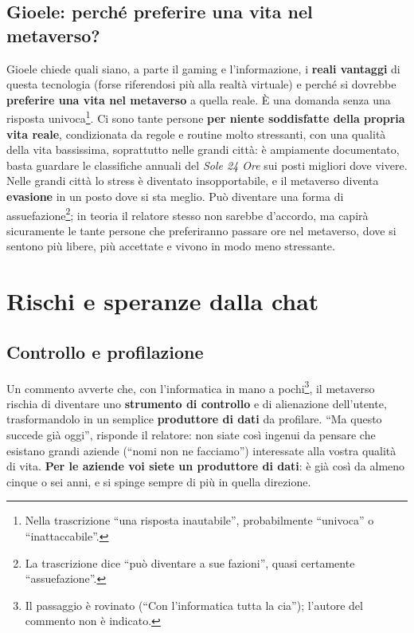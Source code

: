 \subsection{Gioele: perché preferire una vita nel metaverso?}

Gioele chiede quali siano, a parte il gaming e l'informazione, i \textbf{reali
vantaggi} di questa tecnologia (forse riferendosi più alla realtà virtuale) e
perché si dovrebbe \textbf{preferire una vita nel metaverso} a quella reale. È una
domanda senza una risposta univoca\footnote{Nella trascrizione ``una risposta
inautabile'', probabilmente ``univoca'' o ``inattaccabile''.}. Ci sono tante
persone \textbf{per niente soddisfatte della propria vita reale}, condizionata da
regole e routine molto stressanti, con una qualità della vita bassissima,
soprattutto nelle grandi città: è ampiamente documentato, basta guardare le
classifiche annuali del \emph{Sole 24 Ore} sui posti migliori dove vivere. Nelle
grandi città lo stress è diventato insopportabile, e il metaverso diventa
\textbf{evasione} in un posto dove si sta meglio. Può diventare una forma di
assuefazione\footnote{La trascrizione dice ``può diventare a sue fazioni'',
quasi certamente ``assuefazione''.}; in teoria il relatore stesso non sarebbe
d'accordo, ma capirà sicuramente le tante persone che preferiranno passare ore
nel metaverso, dove si sentono più libere, più accettate e vivono in modo meno
stressante.

\section{Rischi e speranze dalla chat}
\label{z8:sec:rischi}

\subsection{Controllo e profilazione}

Un commento avverte che, con l'informatica in mano a pochi\footnote{Il passaggio è
rovinato (``Con l'informatica tutta la cia''); l'autore del commento non è
indicato.}, il metaverso rischia di diventare uno \textbf{strumento di controllo}
e di alienazione dell'utente, trasformandolo in un semplice \textbf{produttore di
dati} da profilare. ``Ma questo succede già oggi'', risponde il relatore: non
siate così ingenui da pensare che esistano grandi aziende (``nomi non ne
facciamo'') interessate alla vostra qualità di vita. \textbf{Per le aziende voi
siete un produttore di dati}: è già così da almeno cinque o sei anni, e si spinge
sempre di più in quella direzione.

